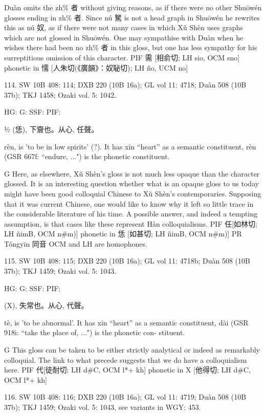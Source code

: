     Duàn omits the zh\% 者 without giving reasons, as if there were no other Shuōwén glosses ending in zh\% 者. Since nú 駑 is not a head graph in Shuōwén he rewrites this as nú 奴, as if there were not many cases in which Xǔ Shèn uses graphs which are not glossed in Shuōwén. One may sympathise with Duàn when he wishes there had been no zh\% 者 in this gloss, but one has less sympathy for his surreptitious omission of this character.
PIF 需 [相俞切; LH sio, OCM sno] phonetic in 懦 [人朱切(《廣韻》：奴䎵切); LH ño, UCM no]


114. SW 10B 408: 114; DXB 220 (10B 16a); GL vol 11: 4718; Duàn 508 (10B 37b); TKJ 1458; Ozaki vol. 5: 1042.


HG:
G: SSF: PIF:

½ (恁), 下齎也。从心,
任聲。


rèn,
is 'to be in low spirits' (?).
It has xīn ``heart'' as a semantic constituent,
rèn (GSR 667f: ``endure, ...") is the phonetic constituent.

G      Here, as elsewhere, Xǔ Shèn's gloss is not much less opaque than the character glossed. It is an interesting question whether what is an opaque gloss to us today might have been good colloquial Chinese to Xǔ Shèn's contemporaries. Supposing that it was current Chinese, one would like to know why it left so little trace in the considerable literature of his time. A possible answer, and indeed a tempting assumption, is that cases like these represent Hàn colloquialisms.
PIF     任[如林切; LH ñimB, OCM n\#m)] phonetic in 恁 [如甚切; LH ñimB, OCM n\#m)]
PR	Tóngyīn 同音 OCM and LH are homophones.

115. SW 10B 408: 115; DXB 220 (10B 16a); GL vol 11: 4718b; Duàn 508 (10B 37b); TKJ 1459; Ozaki vol. 5: 1043.


HG:
G: SSF: PIF:

(X),
失常也。从心,
代聲。

tè,
is 'to be abnormal'.
It has xīn ``heart'' as a semantic constituent,
dài (GSR 918i: ``take the place of, ...") is the phonetic con- stituent.

G	This gloss can be taken to be either strictly analytical or indeed as remarkably colloquial. The link to what precede suggests that we do have a colloquialism here.
PIF     代[徒耐切; LH d\#C, OCM l*+ kh] phonetic in X [他得切; LH d\#C, OCM l*+ kh]



116. SW 10B 408: 116; DXB 220 (10B 16a); GL vol 11: 4719; Duàn 508 (10B 37b); TKJ 1459; Ozaki vol. 5: 1043, see
variants in WGY: 453.


